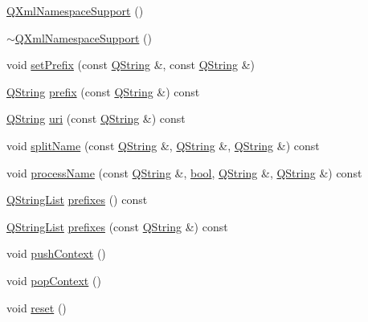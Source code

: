 \begin{DoxyCompactItemize}
\item 
\hyperlink{class_q_xml_namespace_support_a8d2d913ace7a2f2d40cf625ac08c033c}{Q\+Xml\+Namespace\+Support} ()
\item 
\hyperlink{class_q_xml_namespace_support_ad05d7bc400ce90e5efca49a51f8c4372}{$\sim$\+Q\+Xml\+Namespace\+Support} ()
\item 
void \hyperlink{class_q_xml_namespace_support_a21b28d3ac78e3226fe29d8b31d4fbf34}{set\+Prefix} (const \hyperlink{class_q_string}{Q\+String} \&, const \hyperlink{class_q_string}{Q\+String} \&)
\item 
\hyperlink{class_q_string}{Q\+String} \hyperlink{class_q_xml_namespace_support_a0a1189daa47c69be7901177798ae2cf9}{prefix} (const \hyperlink{class_q_string}{Q\+String} \&) const 
\item 
\hyperlink{class_q_string}{Q\+String} \hyperlink{class_q_xml_namespace_support_abb1c89923198caaffac5add69e1b0d43}{uri} (const \hyperlink{class_q_string}{Q\+String} \&) const 
\item 
void \hyperlink{class_q_xml_namespace_support_a31e8ab4509dfec22b6e877996a219f3c}{split\+Name} (const \hyperlink{class_q_string}{Q\+String} \&, \hyperlink{class_q_string}{Q\+String} \&, \hyperlink{class_q_string}{Q\+String} \&) const 
\item 
void \hyperlink{class_q_xml_namespace_support_a5bd90ee9784f7b677ca727adf18d9d8b}{process\+Name} (const \hyperlink{class_q_string}{Q\+String} \&, \hyperlink{qglobal_8h_a1062901a7428fdd9c7f180f5e01ea056}{bool}, \hyperlink{class_q_string}{Q\+String} \&, \hyperlink{class_q_string}{Q\+String} \&) const 
\item 
\hyperlink{class_q_string_list}{Q\+String\+List} \hyperlink{class_q_xml_namespace_support_a4d24779d4be228190c5433b29b39ca43}{prefixes} () const 
\item 
\hyperlink{class_q_string_list}{Q\+String\+List} \hyperlink{class_q_xml_namespace_support_a0d064a4552e9537423262587435d4d42}{prefixes} (const \hyperlink{class_q_string}{Q\+String} \&) const 
\item 
void \hyperlink{class_q_xml_namespace_support_a31a7b184ba03b3d61cde7a5def4cff77}{push\+Context} ()
\item 
void \hyperlink{class_q_xml_namespace_support_ab36c81f4e2e0be48ba2b4ac23e67a578}{pop\+Context} ()
\item 
void \hyperlink{class_q_xml_namespace_support_a9a8940bd95ef75274b9560c3e4358bce}{reset} ()
\end{DoxyCompactItemize}


